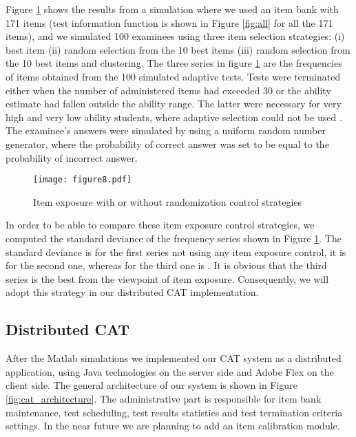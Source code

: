 \documentclass[11pt,twoside]{article}
\begin{document}
Figure \ref{fig:plotItemExposure} shows the results from a simulation where we used an item bank with 171 items (test information function is shown in Figure \ref{fig:all} for all the 171 items), and we simulated 100 examinees using three item selection strategies: (i) best item (ii) random selection from the 10 best items (iii) random selection from the 10 best items and clustering. The three series in figure \ref{fig:plotItemExposure} are the frequencies of items obtained from the 100 simulated adaptive tests. Tests were terminated either when the number of administered items had exceeded 30 or the ability estimate had  fallen outside the ability range. The latter were necessary for very high and very low ability students, where adaptive selection could not be used \cite{BAKER}. The examinee's answers were simulated by using a uniform random number generator, where the probability of correct answer was set to be equal to the probability of incorrect answer.

\begin{figure}[t]
\begin{center}    \texttt{[image: figure8.pdf]} \end{center}
\caption{\label{fig:plotItemExposure} Item exposure with or without randomization control strategies} 
\end{figure}

In order to be able to compare these item exposure control strategies, we computed the standard deviance of the frequency series shown in Figure \ref{fig:plotItemExposure}. The standard deviance is  for the first series not using any item exposure control, it is  for the second one, whereas for the third one is . It is obvious that the third series is the best from the viewpoint of item exposure. Consequently, we will adopt this strategy in our distributed CAT implementation. 


\subsection{Distributed CAT}
After the Matlab simulations we implemented  our CAT system as a distributed application, using Java technologies on the server side and Adobe Flex on the client side. The general architecture of our system is shown in Figure \ref{fig:cat_architecture}. The administrative part is responsible for item bank maintenance, test scheduling, test results statistics and test termination criteria settings. In the near future we are planning to add an item calibration module. 
\end{document}
